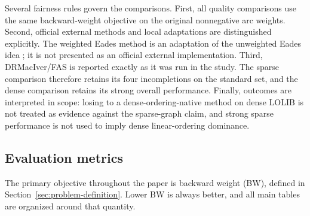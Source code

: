 Several fairness rules govern the comparisons. First, all quality comparisons use the same backward-weight objective on the original nonnegative arc weights. Second, official external methods and local adaptations are distinguished explicitly. The weighted Eades method is an adaptation of the unweighted Eades idea \cite{ELS93}; it is not presented as an official external implementation. Third, DRMacIver/FAS is reported exactly as it was run in the study. The sparse comparison therefore retains its four incompletions on the standard set, and the dense comparison retains its strong overall performance. Finally, outcomes are interpreted in scope: losing to a dense-ordering-native method on dense LOLIB is not treated as evidence against the sparse-graph claim, and strong sparse performance is not used to imply dense linear-ordering dominance.

\subsection{Evaluation metrics}

The primary objective throughout the paper is backward weight (BW), defined in Section~\ref{sec:problem-definition}. Lower BW is always better, and all main tables are organized around that quantity.

